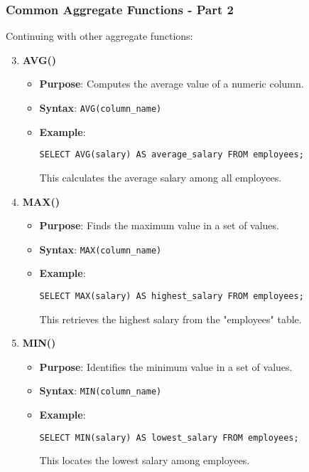 \documentclass[aspectratio=169]{beamer}
\begin{document}
\begin{frame}[fragile]
    \frametitle{Common Aggregate Functions - Part 2}
    Continuing with other aggregate functions:

    \begin{enumerate}
        \setcounter{enumi}{2} %
        \item \textbf{AVG()}
            \begin{itemize}
                \item \textbf{Purpose}: Computes the average value of a numeric column.
                \item \textbf{Syntax}: \texttt{AVG(column_name)}
                \item \textbf{Example}:
                \begin{lstlisting}
SELECT AVG(salary) AS average_salary FROM employees;
                \end{lstlisting}
                This calculates the average salary among all employees.
            \end{itemize}

        \item \textbf{MAX()}
            \begin{itemize}
                \item \textbf{Purpose}: Finds the maximum value in a set of values.
                \item \textbf{Syntax}: \texttt{MAX(column_name)}
                \item \textbf{Example}:
                \begin{lstlisting}
SELECT MAX(salary) AS highest_salary FROM employees;
                \end{lstlisting}
                This retrieves the highest salary from the "employees" table.
            \end{itemize}

        \item \textbf{MIN()}
            \begin{itemize}
                \item \textbf{Purpose}: Identifies the minimum value in a set of values.
                \item \textbf{Syntax}: \texttt{MIN(column_name)}
                \item \textbf{Example}:
                \begin{lstlisting}
SELECT MIN(salary) AS lowest_salary FROM employees;
                \end{lstlisting}
                This locates the lowest salary among employees.
            \end{itemize}
    \end{enumerate}
\end{frame}
\end{document}
